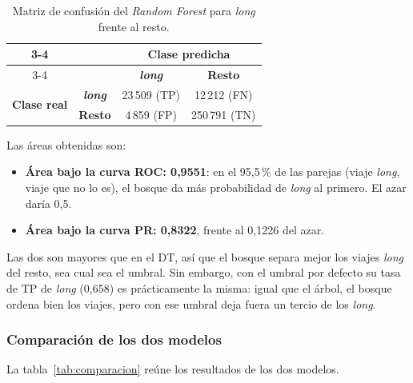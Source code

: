 \documentclass[12pt,a4paper]{article}
\begin{document}
\begin{table}[H]
\centering
\renewcommand{\arraystretch}{1.2}
\begin{tabular}{cc|c|c|}
\cline{3-4}
& & \multicolumn{2}{c|}{\textbf{Clase predicha}} \\
\cline{3-4}
& & \textit{\textbf{long}} & \textbf{Resto} \\
\hline
\multicolumn{1}{|c|}{\multirow{2}{*}{\textbf{Clase real}}} & \textit{\textbf{long}} & \cellcolor{green!25}23\,509 (\acs{TP}) & \cellcolor{red!25}12\,212 (\acs{FN}) \\
\cline{2-4}
\multicolumn{1}{|c|}{} & \textbf{Resto} & \cellcolor{red!25}4\,859 (\acs{FP}) & \cellcolor{green!25}250\,791 (\acs{TN}) \\
\hline
\end{tabular}
\caption{Matriz de confusión del \textit{Random Forest} para \textit{long}
frente al resto.}
\label{tab:cm-rf-long}
\end{table}

Las áreas obtenidas son:
\begin{itemize}
    \item \textbf{Área bajo la curva \acs{ROC}: 0,9551}: en el 95,5\,\% de
    las parejas (viaje \textit{long}, viaje que no lo es), el bosque da más
    probabilidad de \textit{long} al primero. El azar daría 0,5.
    \item \textbf{Área bajo la curva \acs{PR}: 0,8322}, frente al 0,1226 del
    azar.
\end{itemize}
Las dos son mayores que en el \ac{DT}, así que el bosque separa mejor los
viajes \textit{long} del resto, sea cual sea el umbral. Sin embargo, con
el umbral por defecto su tasa de \acs{TP} de \textit{long} (0,658) es
prácticamente la misma: igual que el árbol, el bosque ordena bien los
viajes, pero con ese umbral deja fuera un tercio de los \textit{long}.

\subsubsection{Comparación de los dos modelos}
\label{sec:comparacion}

La tabla~\ref{tab:comparacion} reúne los resultados de los dos modelos.
\end{document}
